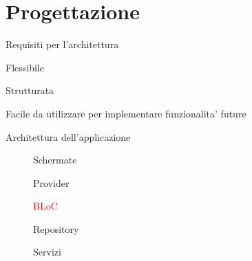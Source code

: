 \documentclass[12pt,italian,oneside]{report}
\newcommand{\rosso}[1]{\textcolor{red}{#1}}
\begin{document}
\newpage

\section{Progettazione}

\begin{firstheadlineitemize}

\item Requisiti per l'architettura

\begin{secondheadlineitemize}

\item Flessibile
\item Strutturata
\item Facile da utilizzare per implementare funzionalita' future

\end{secondheadlineitemize}

\newpage

\item Architettura dell'applicazione

\begin{figure}[htp]
\centering
\hfill
\begin{minipage}[b]{.3\columnwidth}
\centering
  \begin{secondheadlineitemize}

\item Schermate
\item Provider
\item \rosso{BLoC}
\item Repository
\item Servizi


\end{secondheadlineitemize}
\end{minipage}
\end{figure}
\end{firstheadlineitemize}
\end{document}
